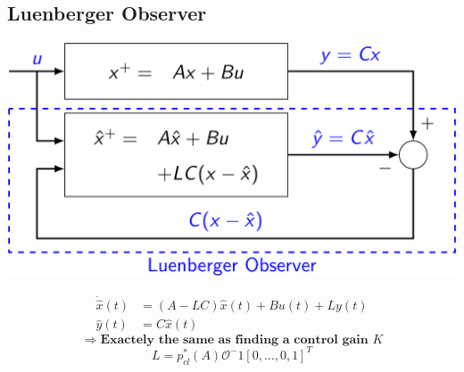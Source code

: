 \subsection{Luenberger Observer}
    \centerline{\includegraphics[width=0.8\linewidth]{src/4_state_estimation/images/luenberger_observer.jpeg}}
    \vspace*{-1em}
    \begin{align*}
        \dot{\hat{x}}(t) &= (A-LC)\hat{x}(t) + Bu(t) + Ly(t)\\
        \hat{y}(t) &= C\hat{x}(t)
    \end{align*}
    $$
    \Rightarrow \textbf{Exactely the same as finding a control gain $K$}
    $$
    $$
    L = p_{cl}^*(A)\mathcal{O}^-1[0, \hdots, 0, 1]^T
    $$